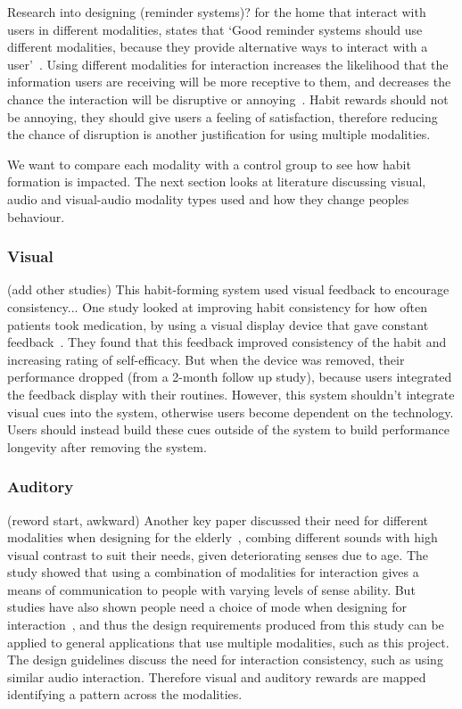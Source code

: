 \documentclass{scaffold/sigchi}
\begin{document}
Research into designing (reminder systems)? for the home that interact with users in different modalities, states that
`Good reminder systems should use different modalities, because they provide alternative ways to interact with a user'~\cite{article_designing_multimodal_reminders_for_home}.
Using different modalities for interaction increases the likelihood that the information users are receiving will be more receptive to them,
and decreases the chance the interaction will be disruptive or annoying~\cite{article_designing_multimodal_reminders_for_home}.
Habit rewards should not be annoying, they should give users a feeling of satisfaction, therefore reducing the chance of disruption is another justification for using multiple modalities.

We want to compare each modality with a control group to see how habit formation is impacted. The next section looks at literature discussing visual, audio and visual-audio modality types used and how they change peoples behaviour.

\subsubsection{Visual}
(add other studies)
This habit-forming system used visual feedback to encourage consistency...
One study looked at improving habit consistency for how often patients took medication,
by using a visual display device that gave constant feedback~\cite{article_realtime_feedback_improving_medication_taking}.
They found that this feedback improved consistency of the habit and increasing rating of self-efficacy.
But when the device was removed, their performance dropped (from a 2-month follow up study), because users integrated the feedback display with their routines.
However, this system shouldn't integrate visual cues into the system, otherwise users become dependent on the technology.
Users should instead build these cues outside of the system to build performance longevity after removing the system.

\subsubsection{Auditory}
(reword start, awkward)
Another key paper discussed their need for different modalities when designing for the elderly~\cite{article_movipill_improving_medication_elders},
combing different sounds with high visual contrast to suit their needs, given deteriorating senses due to age.
The study showed that using a combination of modalities for interaction gives a means of communication to people with varying levels of sense ability.
But studies have also shown people need a choice of mode when designing for interaction~\cite{article_user_centred_multimodal_reminders},
and thus the design requirements produced from this study can be applied to general applications that use multiple modalities, such as this project.
The design guidelines discuss the need for interaction consistency, such as using similar audio interaction.
Therefore visual and auditory rewards are mapped identifying a pattern across the modalities.
\end{document}
